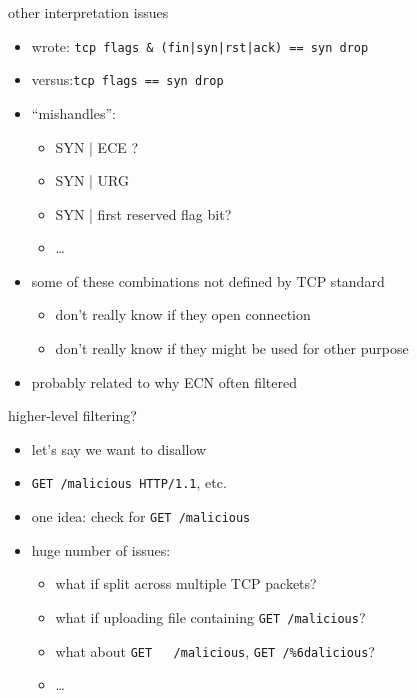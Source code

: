 \begin{frame}[fragile]{other interpretation issues}
\begin{itemize}
\item wrote: \verb^tcp flags & (fin|syn|rst|ack) == syn drop^
\item versus:\verb|tcp flags == syn drop|
\item ``mishandles'':
    \begin{itemize}
    \item SYN | ECE ?
    \item SYN | URG 
    \item SYN | first reserved flag bit?
    \item \ldots
    \end{itemize}
\item some of these combinations not defined by TCP standard
    \begin{itemize}
    \item don't really know if they open connection
    \item don't really know if they might be used for other purpose
    \end{itemize}
\item probably related to why ECN often filtered
\end{itemize}
\end{frame}

\begin{frame}[fragile]{higher-level filtering?}
    \begin{itemize}
    \item let's say we want to disallow
    \item \verb|GET /malicious HTTP/1.1|, etc.
    \vspace{.5cm}
    \item one idea: check for \verb|GET /malicious|
    \item huge number of issues:
        \begin{itemize}
        \item what if split across multiple TCP packets?
        \item what if uploading file containing \verb|GET /malicious|?
        \item what about \verb|GET   /malicious|, \verb|GET /%6dalicious|?
        \item \ldots
        \end{itemize}
    \end{itemize}
\end{frame}
